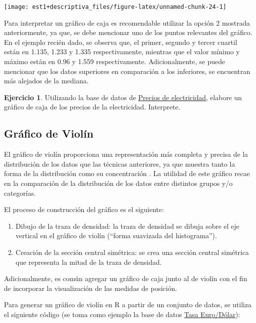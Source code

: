 \documentclass[
  11pt,
]{book}
\providecommand{\tightlist}{%
  \setlength{\itemsep}{0pt}\setlength{\parskip}{0pt}}
\theoremstyle{definition}
\theoremstyle{definition}
\theoremstyle{definition}
\newtheorem{exercise}{Ejercicio}[chapter]
\theoremstyle{definition}
\theoremstyle{remark}
\begin{document}
\begin{center}\texttt{[image: est1+descriptiva\_files/figure-latex/unnamed-chunk-24-1]} \end{center}

Para interpretar un gráfico de caja es recomendable utilizar la opción 2 mostrada anteriormente, ya que, se debe mencionar uno de los puntos relevantes del gráfico. En el ejemplo recién dado, se observa que, el primer, segundo y tercer cuartil están en 1.135, 1.233 y 1.335 respectivamente, mientras que el valor mínimo y máximo están en 0.96 y 1.559 respectivamente. Adicionalmente, se puede mencionar que los datos superiores en comparación a los inferiores, se encuentran más alejados de la mediana.

\begin{exercise}
Utilizando la base de datos de \hyperref[PreciosElectricidad]{Precios de electricidad}, elabore un gráfico de caja de los precios de la electricidad. Interprete.
\end{exercise}

\subsection{Gráfico de Violín}\label{topicos-graficos-violin}

El gráfico de violín proporciona una representación más completa y precisa de la distribución de los datos que las técnicas anteriores, ya que muestra tanto la forma de la distribución como su concentración \citep{hintze1998violin}. La utilidad de este gráfico recae en la comparación de la distribución de los datos entre distintos grupos y/o categorías.

El proceso de construcción del gráfico es el siguiente:

\begin{enumerate}
\def\labelenumi{\arabic{enumi}.}
\tightlist
\item
  Dibujo de la traza de densidad: la traza de densidad se dibuja sobre el eje vertical en el gráfico de violín (``forma suavizada del histograma'').
\item
  Creación de la sección central simétrica: se crea una sección central simétrica que representa la mitad de la traza de densidad.
\end{enumerate}

Adicionalmente, es común agregar un gráfico de caja junto al de violín con el fin de incorporar la visualización de las medidas de posición.

Para generar un gráfico de violín en R a partir de un conjunto de datos, se utiliza el siguiente código (se toma como ejemplo la base de datos \hyperref[TasaEURUSD]{Tasa Euro/Dólar}):
\end{document}
